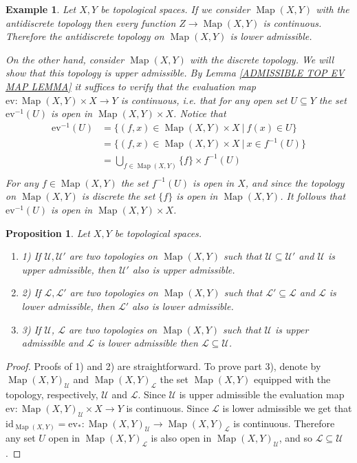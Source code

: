 \documentclass[11pt, letterpaper, oneside]{report}
\theoremstyle{pplain}
\newtheorem{proposition}[theorem]{Proposition}
\newtheorem{ITERMVALUE THM}[theorem]{Intermediate Value Theorem}
\newtheorem{HEINEBOREL THM}[theorem]{Heine-Borel Theorem}
\newtheorem{UMETR THM}[theorem]{Urysohn Metrization Theorem}
\newtheorem{UMETR2 THM}[theorem]{Urysohn Metrization Theorem (v.2)}
\theoremstyle{ddefinition}
\newtheorem{example}[theorem]{Example}
\theoremstyle{nnn}
\newtheorem{TDA NN}[theorem]{Topological Data Analysis. }
\theoremstyle{eexercise}
\newcommand{\Map}{\operatorname{Map}}
\newcommand{\ev}{\mathrm{ev}}
\newcommand{\id}{\mathrm{id}}
\newcommand{\benu}{\begin{enumerate}}
\newcommand{\eenu}{\end{enumerate}}
\begin{document}
\begin{example}
Let $X, Y$ be topological spaces. If we consider $\Map(X, Y)$ with the antidiscrete topology then every 
function $Z\to \Map(X, Y)$ is continuous. Therefore the antidiscrete topology on $\Map(X, Y)$ is lower
admissible. 

On the other hand, consider $\Map(X, Y)$ with the discrete topology. We will show that this topology is 
upper admissible. By Lemma  \ref{ADMISSIBLE TOP EV MAP LEMMA} it suffices to verify that the 
evaluation map $\ev\colon \Map(X, Y) \times X \to Y$ is continuous, i.e. that for any open set $U\subseteq Y$
the set $\ev^{-1}(U)$ is open in $\Map(X, Y) \times X$. Notice that 
\begin{align*}
\ev^{-1}(U) & = \{(f, x) \in \Map(X, Y) \times X \ | \ f(x)\in U \}  \\
& = \{(f, x) \in \Map(X, Y) \times X \ | \ x \in f^{-1}(U)  \}  \\
& = \bigcup_{f\in \Map(X, Y)} \{f \}\times f^{-1}(U) \\
\end{align*}
For any $f\in \Map(X, Y)$ the set $f^{-1}(U)$ is open in $X$, and since the topology on $\Map(X, Y)$ is discrete 
the set $\{f\}$  is open in $\Map(X, Y)$. It follows that $\ev^{-1}(U)$ is open in $\Map(X, Y) \times X$.
\end{example}


\begin{proposition}
\label{ADMISSIBLE TOP INCLUSION PROP}
Let $X, Y$ be topological spaces. 
\benu
\item[1)] If $\mathcal{U}, \mathcal{U'}$ are two topologies on $\Map(X, Y)$ such that 
$\mathcal{U}\subseteq \mathcal{U'}$ and $\mathcal{U}$ is upper admissible, then $\mathcal{U'}$
also is upper admissible. 

\item[2)] If $\mathcal{L}, \mathcal{L'}$ are two topologies on $\Map(X, Y)$ such that 
$\mathcal{L'}\subseteq \mathcal{L}$ and $\mathcal{L}$ is lower admissible, then $\mathcal{L'}$
also is lower admissible. 

\item[3)] If  $\mathcal{U}$, $\mathcal{L}$ are two topologies on $\Map(X, Y)$
such that $\mathcal{U}$ is upper admissible and  $\mathcal{L}$ is lower admissible then  
$\mathcal{L}\subseteq \mathcal{U}$. 
\eenu
\end{proposition}


\begin{proof}
Proofs of 1) and 2) are straightforward. 
To prove part 3), denote by $\Map(X, Y)_{\mathcal{U}}$  and  $\Map(X, Y)_{\mathcal{L}}$ the set $\Map(X, Y)$ 
equipped with  the topology, respectively,  $\mathcal{U}$ and $\mathcal{L}$. Since $\mathcal{U}$ is upper 
admissible the evaluation  map $\ev\colon \Map(X, Y)_{\mathcal{U}} \times X \to Y$ is continuous. Since $\mathcal{L}$ 
is lower admissible we get that $\id_{\Map(X,Y)} = \ev_{\ast}\colon \Map(X, Y)_{\mathcal{U}} \to \Map(X, Y)_{\mathcal{L}}$ is continuous. Therefore any set $U$  open in  $\Map(X, Y)_{\mathcal{L}}$ is also open in  $\Map(X, Y)_{\mathcal{U}}$, 
and so  $\mathcal{L}\subseteq \mathcal{U}$.
\end{proof}
\end{document}
